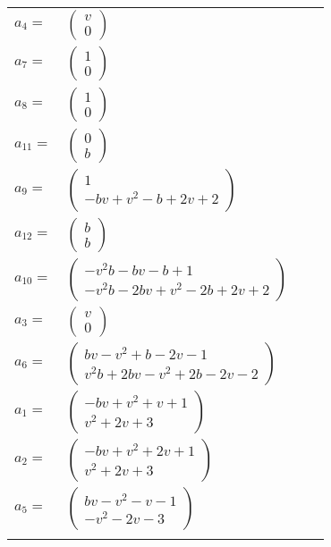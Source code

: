 \documentclass[1p]{elsarticle_modified}
\theoremstyle{definition}
\begin{document}
\begin{tabular}{m{7pt} m{180pt} m{7pt} m{180pt} }
\flushright $a_{4}=$&$\begin{pmatrix}v\\0\end{pmatrix}$ \\
\flushright $a_{7}=$&$\begin{pmatrix}1\\0\end{pmatrix}$ \\
\flushright $a_{8}=$&$\begin{pmatrix}1\\0\end{pmatrix}$ \\
\flushright $a_{11}=$&$\begin{pmatrix}0\\b\end{pmatrix}$ \\
\flushright $a_{9}=$&$\begin{pmatrix}1\\- b v+v^2- b+2 v+2\end{pmatrix}$ \\
\flushright $a_{12}=$&$\begin{pmatrix}b\\b\end{pmatrix}$ \\
\flushright $a_{10}=$&$\begin{pmatrix}- v^2 b- b v- b+1\\- v^2 b-2 b v+v^2-2 b+2 v+2\end{pmatrix}$ \\
\flushright $a_{3}=$&$\begin{pmatrix}v\\0\end{pmatrix}$ \\
\flushright $a_{6}=$&$\begin{pmatrix}b v- v^2+b-2 v-1\\v^2 b+2 b v- v^2+2 b-2 v-2\end{pmatrix}$ \\
\flushright $a_{1}=$&$\begin{pmatrix}- b v+v^2+v+1\\v^2+2 v+3\end{pmatrix}$ \\
\flushright $a_{2}=$&$\begin{pmatrix}- b v+v^2+2 v+1\\v^2+2 v+3\end{pmatrix}$ \\
\flushright $a_{5}=$&$\begin{pmatrix}b v- v^2- v-1\\- v^2-2 v-3\end{pmatrix}$\\&\end{tabular}
\end{document}
